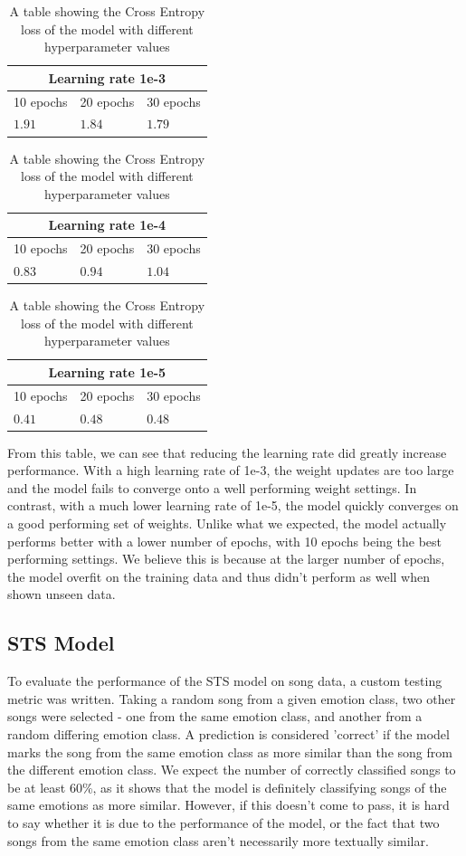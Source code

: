\documentclass[11pt]{article}
\begin{document}
\begin{table}[H]
    \centering
    \caption{A table showing the Cross Entropy loss of the model with different hyperparameter values}
    \begin{tabularx}{0.48\textwidth}{|X X X|} 
      \hline
      \multicolumn{3}{|c|}{Learning rate 1e-3} \\ \hline 
      10 epochs & 20 epochs & 30 epochs \\ \hline
      $1.91$&$1.84$ &$1.79$ \\ \hline
    \end{tabularx}
    \begin{tabularx}{0.48\textwidth}{|X X X|} 
        \hline
        \multicolumn{3}{|c|}{Learning rate 1e-4} \\ \hline 
        10 epochs & 20 epochs & 30 epochs \\ \hline
        $0.83$&$0.94$ &$1.04$ \\ \hline
      \end{tabularx}
      \begin{tabularx}{0.48\textwidth}{|X X X|} 
        \hline
        \multicolumn{3}{|c|}{Learning rate 1e-5} \\ \hline 
        10 epochs & 20 epochs & 30 epochs \\ \hline
        $0.41$&$0.48$ &$0.48$ \\ \hline
    \end{tabularx}
    \label{tbl:crossEntropy}
\end{table}

From this table, we can see that reducing the learning rate did greatly increase performance. With a high learning rate of 1e-3, the weight updates are too large and the model fails to converge onto a well performing weight settings. In contrast, with a much lower learning rate of 1e-5, the model quickly converges on a good performing set of weights. Unlike what we expected, the model actually performs better with a lower number of epochs, with 10 epochs being the best performing settings. We believe this is because at the larger number of epochs, the model overfit on the training data and thus didn't perform as well when shown unseen data.

\subsection{STS Model}


To evaluate the performance of the STS model on song data, a custom testing metric was written. Taking a random song from a given emotion class, two other songs were selected - one from the same emotion class, and another from a random differing emotion class. A prediction is considered 'correct' if the model marks the song from the same emotion class as more similar than the song from the different emotion class.
We expect the number of correctly classified songs to be at least 60\%, as it shows that the model is definitely classifying songs of the same emotions as more similar. However, if this doesn't come to pass, it is hard to say whether it is due to the performance of the model, or the fact that two songs from the same emotion class aren't necessarily more textually similar.
\end{document}
